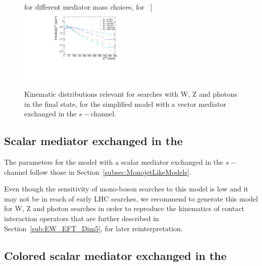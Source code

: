\begin{figure}[h!]
for different mediator mass choices, for ~\gev\label{fig:DMV_EW_Z_MET_SVMed}]{%
\includegraphics[width=0.45\textwidth]{figures/EW/pt_vv_Mx15}
}    
\hfill
{}    
\caption{Kinematic distributions relevant for searches with W, Z and photons in the final state, 
for the simplified model
       with a vector mediator exchanged in the $s-$channel.}
\label{fig:DMV_EW_kinematics_SVMed}
\end{figure}

\subsection{Scalar mediator exchanged in the \schannel}
\label{sub:EW_Scalar}

The parameters for the model with a scalar mediator exchanged in the $s-$ channel 
follow those in Section~\ref{subsec:MonojetLikeModels}. 

Even though the sensitivity of mono-boson searches to this model is low and it may not
be in reach of early LHC searches, we recommend to generate this model for W, Z and photon searches 
in order to reproduce the kinematics of contact interaction operators that are further 
described in Section~\ref{sub:EW_EFT_Dim5}, for later reinterpretation.  

\subsection{Colored scalar mediator exchanged in the \tchannel}

